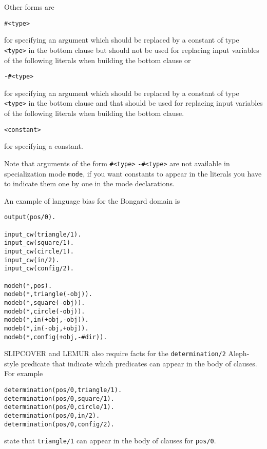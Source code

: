 Other forms are
\begin{verbatim}
#<type>
\end{verbatim}
for specifying an argument which should be replaced by a constant of type \texttt{<type>} in the bottom clause but should not be used for replacing input variables of the following literals when building the bottom clause or 
\begin{verbatim}
-#<type>
\end{verbatim}
for specifying an argument which should be replaced by a constant of type \texttt{<type>} in the bottom clause and that should be used for replacing input variables of the following literals when building the bottom clause. 
\begin{verbatim}
<constant>
\end{verbatim}
for specifying a constant.

Note that arguments of the form
\verb|#<type>| \verb|-#<type>| are not available in 
specialization mode \verb|mode|, if you want constants to appear in 
the literals you have to indicate them one by one in the mode declarations.


An example of language bias for the Bongard domain is
\begin{verbatim}
output(pos/0).

input_cw(triangle/1).
input_cw(square/1).
input_cw(circle/1).
input_cw(in/2).
input_cw(config/2).

modeh(*,pos).
modeb(*,triangle(-obj)).
modeb(*,square(-obj)).
modeb(*,circle(-obj)).
modeb(*,in(+obj,-obj)).
modeb(*,in(-obj,+obj)).
modeb(*,config(+obj,-#dir)).
\end{verbatim}
SLIPCOVER and LEMUR also require facts for the \verb|determination/2| Aleph-style predicate that indicate which predicates can appear in the body of clauses. 
For example
\begin{verbatim}
determination(pos/0,triangle/1).
determination(pos/0,square/1).
determination(pos/0,circle/1).
determination(pos/0,in/2).
determination(pos/0,config/2).
\end{verbatim}
state that \verb|triangle/1| can appear in the body of clauses for \verb|pos/0|.


